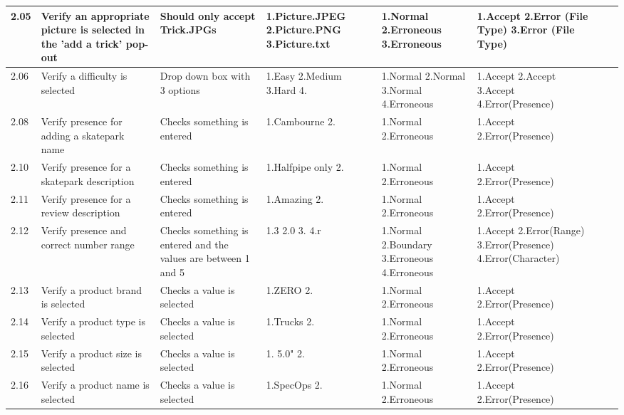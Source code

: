 \begin{landscape}
\begin{center}
\begin{longtable}{|p{1.5cm}|p{2.5cm}|p{2.5cm}|p{2cm}|p{2cm}|p{2cm}|p{2cm}|p{2cm}|}
2.05 & Verify an appropriate picture is selected in the 'add a trick' pop-out & Should only accept Trick.JPGs & 1.Picture.JPEG 2.Picture.PNG 3.Picture.txt & 1.Normal 2.Erroneous 3.Erroneous & 1.Accept 2.Error (File Type) 3.Error (File Type) & & \\ \hline

2.06 & Verify a difficulty is selected & Drop down box with 3 options & 1.Easy 2.Medium 3.Hard 4. & 1.Normal 2.Normal 3.Normal 4.Erroneous & 1.Accept 2.Accept 3.Accept 4.Error(Presence) & & \\ \hline


2.08 & Verify presence for adding a skatepark name & Checks something is entered & 1.Cambourne 2.  & 1.Normal 2.Erroneous & 1.Accept 2.Error(Presence) & & \\ \hline 



2.10 & Verify presence for a skatepark description & Checks something is entered & 1.Halfpipe only 2.  & 1.Normal 2.Erroneous & 1.Accept 2.Error(Presence) & & \\ \hline

2.11 & Verify presence for a review description & Checks something is entered & 1.Amazing 2. & 1.Normal 2.Erroneous & 1.Accept 2.Error(Presence) & & \\ \hline

2.12 & Verify presence and correct number range & Checks something is entered and the values are between 1 and 5 & 1.3 2.0 3. 4.r & 1.Normal 2.Boundary 3.Erroneous 4.Erroneous & 1.Accept 2.Error(Range) 3.Error(Presence) 4.Error(Character) & & \\ \hline

2.13 & Verify a product brand is selected & Checks a value is selected & 1.ZERO 2. & 1.Normal 2.Erroneous & 1.Accept 2.Error(Presence) & & \\ \hline

2.14 & Verify a product type is selected & Checks a value is selected & 1.Trucks 2. & 1.Normal 2.Erroneous & 1.Accept 2.Error(Presence) & & \\ \hline

2.15 & Verify a product size is selected & Checks a value is selected & 1. 5.0" 2. & 1.Normal 2.Erroneous & 1.Accept 2.Error(Presence) & & \\ \hline

2.16 & Verify a product name is selected & Checks a value is selected & 1.SpecOps 2. & 1.Normal 2.Erroneous & 1.Accept 2.Error(Presence) & & \\ \hline






\end{longtable}
\end{center}
\end{landscape}
